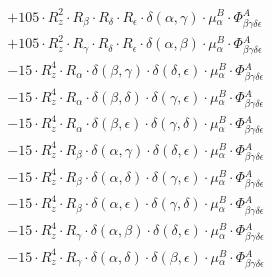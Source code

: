 \documentclass{article}
\begin{document}
\begin{equation}
\begin{array}{c}
 \\[0.2em] 		 + 105 \cdot R_{z}^{2} \cdot R_{\beta{}} \cdot R_{\delta{}} \cdot R_{\epsilon{}} \cdot \delta{}\left(\alpha{}, \gamma{}\right) \cdot \mu{}^{B}_{\alpha{}} \cdot \Phi{}^{A}_{\beta{}\gamma{}\delta{}\epsilon{}} 
 \\[0.2em] 		 + 105 \cdot R_{z}^{2} \cdot R_{\gamma{}} \cdot R_{\delta{}} \cdot R_{\epsilon{}} \cdot \delta{}\left(\alpha{}, \beta{}\right) \cdot \mu{}^{B}_{\alpha{}} \cdot \Phi{}^{A}_{\beta{}\gamma{}\delta{}\epsilon{}} 
 \\[0.2em] 		 - 15 \cdot R_{z}^{4} \cdot R_{\alpha{}} \cdot \delta{}\left(\beta{}, \gamma{}\right) \cdot \delta{}\left(\delta{}, \epsilon{}\right) \cdot \mu{}^{B}_{\alpha{}} \cdot \Phi{}^{A}_{\beta{}\gamma{}\delta{}\epsilon{}} 
 \\[0.2em] 		 - 15 \cdot R_{z}^{4} \cdot R_{\alpha{}} \cdot \delta{}\left(\beta{}, \delta{}\right) \cdot \delta{}\left(\gamma{}, \epsilon{}\right) \cdot \mu{}^{B}_{\alpha{}} \cdot \Phi{}^{A}_{\beta{}\gamma{}\delta{}\epsilon{}} 
 \\[0.2em] 		 - 15 \cdot R_{z}^{4} \cdot R_{\alpha{}} \cdot \delta{}\left(\beta{}, \epsilon{}\right) \cdot \delta{}\left(\gamma{}, \delta{}\right) \cdot \mu{}^{B}_{\alpha{}} \cdot \Phi{}^{A}_{\beta{}\gamma{}\delta{}\epsilon{}} 
 \\[0.2em] 		 - 15 \cdot R_{z}^{4} \cdot R_{\beta{}} \cdot \delta{}\left(\alpha{}, \gamma{}\right) \cdot \delta{}\left(\delta{}, \epsilon{}\right) \cdot \mu{}^{B}_{\alpha{}} \cdot \Phi{}^{A}_{\beta{}\gamma{}\delta{}\epsilon{}} 
 \\[0.2em] 		 - 15 \cdot R_{z}^{4} \cdot R_{\beta{}} \cdot \delta{}\left(\alpha{}, \delta{}\right) \cdot \delta{}\left(\gamma{}, \epsilon{}\right) \cdot \mu{}^{B}_{\alpha{}} \cdot \Phi{}^{A}_{\beta{}\gamma{}\delta{}\epsilon{}} 
 \\[0.2em] 		 - 15 \cdot R_{z}^{4} \cdot R_{\beta{}} \cdot \delta{}\left(\alpha{}, \epsilon{}\right) \cdot \delta{}\left(\gamma{}, \delta{}\right) \cdot \mu{}^{B}_{\alpha{}} \cdot \Phi{}^{A}_{\beta{}\gamma{}\delta{}\epsilon{}} 
 \\[0.2em] 		 - 15 \cdot R_{z}^{4} \cdot R_{\gamma{}} \cdot \delta{}\left(\alpha{}, \beta{}\right) \cdot \delta{}\left(\delta{}, \epsilon{}\right) \cdot \mu{}^{B}_{\alpha{}} \cdot \Phi{}^{A}_{\beta{}\gamma{}\delta{}\epsilon{}} 
 \\[0.2em] 		 - 15 \cdot R_{z}^{4} \cdot R_{\gamma{}} \cdot \delta{}\left(\alpha{}, \delta{}\right) \cdot \delta{}\left(\beta{}, \epsilon{}\right) \cdot \mu{}^{B}_{\alpha{}} \cdot \Phi{}^{A}_{\beta{}\gamma{}\delta{}\epsilon{}} 

\end{array}
\end{equation}
\end{document}
